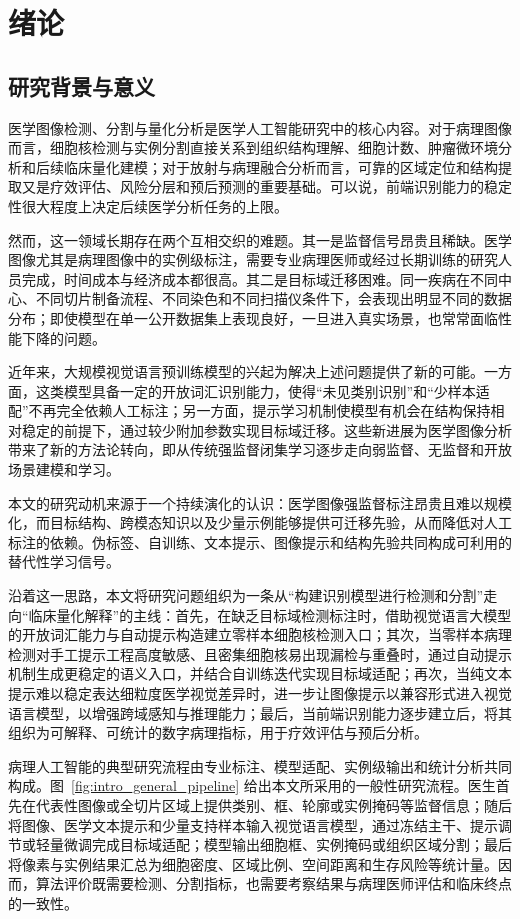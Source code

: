 \chapter{绪论}

\section{研究背景与意义}
医学图像检测、分割与量化分析是医学人工智能研究中的核心内容。对于病理图像而言，细胞核检测与实例分割直接关系到组织结构理解、细胞计数、肿瘤微环境分析和后续临床量化建模；对于放射与病理融合分析而言，可靠的区域定位和结构提取又是疗效评估、风险分层和预后预测的重要基础。可以说，前端识别能力的稳定性很大程度上决定后续医学分析任务的上限。

然而，这一领域长期存在两个互相交织的难题。其一是监督信号昂贵且稀缺。医学图像尤其是病理图像中的实例级标注，需要专业病理医师或经过长期训练的研究人员完成，时间成本与经济成本都很高。其二是目标域迁移困难。同一疾病在不同中心、不同切片制备流程、不同染色和不同扫描仪条件下，会表现出明显不同的数据分布；即使模型在单一公开数据集上表现良好，一旦进入真实场景，也常常面临性能下降的问题。

近年来，大规模视觉语言预训练模型的兴起为解决上述问题提供了新的可能。一方面，这类模型具备一定的开放词汇识别能力，使得“未见类别识别”和“少样本适配”不再完全依赖人工标注；另一方面，提示学习机制使模型有机会在结构保持相对稳定的前提下，通过较少附加参数实现目标域迁移。这些新进展为医学图像分析带来了新的方法论转向，即从传统强监督闭集学习逐步走向弱监督、无监督和开放场景建模和学习。

本文的研究动机来源于一个持续演化的认识：医学图像强监督标注昂贵且难以规模化，而目标结构、跨模态知识以及少量示例能够提供可迁移先验，从而降低对人工标注的依赖。伪标签、自训练、文本提示、图像提示和结构先验共同构成可利用的替代性学习信号。

沿着这一思路，本文将研究问题组织为一条从“构建识别模型进行检测和分割”走向“临床量化解释”的主线：首先，在缺乏目标域检测标注时，借助视觉语言大模型的开放词汇能力与自动提示构造建立零样本细胞核检测入口；其次，当零样本病理检测对手工提示工程高度敏感、且密集细胞核易出现漏检与重叠时，通过自动提示机制生成更稳定的语义入口，并结合自训练迭代实现目标域适配；再次，当纯文本提示难以稳定表达细粒度医学视觉差异时，进一步让图像提示以兼容形式进入视觉语言模型，以增强跨域感知与推理能力；最后，当前端识别能力逐步建立后，将其组织为可解释、可统计的数字病理指标，用于疗效评估与预后分析。

病理人工智能的典型研究流程由专业标注、模型适配、实例级输出和统计分析共同构成。图~\ref{fig:intro_general_pipeline} 给出本文所采用的一般性研究流程。医生首先在代表性图像或全切片区域上提供类别、框、轮廓或实例掩码等监督信息；随后将图像、医学文本提示和少量支持样本输入视觉语言模型，通过冻结主干、提示调节或轻量微调完成目标域适配；模型输出细胞框、实例掩码或组织区域分割；最后将像素与实例结果汇总为细胞密度、区域比例、空间距离和生存风险等统计量。因而，算法评价既需要检测、分割指标，也需要考察结果与病理医师评估和临床终点的一致性。

